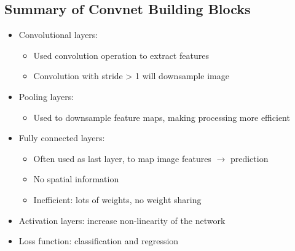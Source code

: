 \documentclass[10pt]{article}
\begin{document}
\subsection*{Summary of Convnet Building Blocks}
\begin{itemize}
	\item Convolutional layers:
	\begin{itemize}
        \item Used convolution operation to extract features
        \item Convolution with stride > 1 will downsample image
    \end{itemize}
	\item Pooling layers:
	\begin{itemize}
        \item Used to downsample feature maps, making processing more efficient
    \end{itemize}
	\item Fully connected layers:
	\begin{itemize}
        \item Often used as last layer, to map image features $\rightarrow$ prediction
        \item No spatial information
        \item Inefficient: lots of weights, no weight sharing
    \end{itemize}
    \item Activation layers: increase non-linearity of the network
    \item Loss function: classification and regression
\end{itemize}
\end{document}
